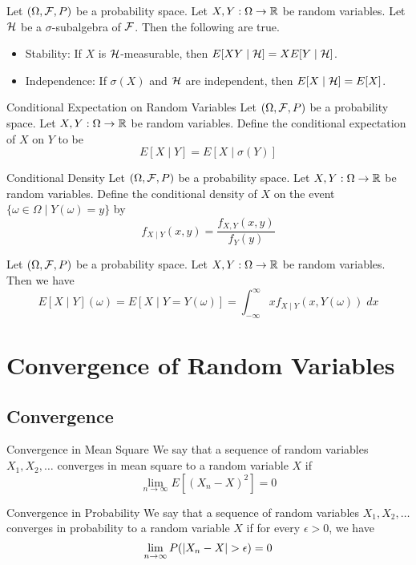 \documentclass[a4paper]{article}
\begin{document}
\begin{lmm}{}{} Let $(\Omega,\mathcal{F},P)$ be a probability space. Let $X,Y:\Omega\to\mathbb{R}$ be random variables. Let $\mathcal{H}$ be a $\sigma$-subalgebra of $\mathcal{F}$. Then the following are true. 
\begin{itemize}
\item Stability: If $X$ is $\mathcal{H}$-measurable, then $E[XY\;|\;\mathcal{H}]=XE[Y\;|\;\mathcal{H}]$. 
\item Independence: If $\sigma(X)$ and $\mathcal{H}$ are independent, then $E[X\;|\;\mathcal{H}]=E[X]$. 
\end{itemize}
\end{lmm}

\begin{defn}{Conditional Expectation on Random Variables}{} Let $(\Omega,\mathcal{F},P)$ be a probability space. Let $X,Y:\Omega\to\mathbb{R}$ be random variables. Define the conditional expectation of $X$ on $Y$ to be $$E[X\;|\;Y]=E[X\;|\;\sigma(Y)]$$
\end{defn}

\begin{defn}{Conditional Density}{} Let $(\Omega,\mathcal{F},P)$ be a probability space. Let $X,Y:\Omega\to\mathbb{R}$ be random variables. Define the conditional density of $X$ on the event $\{\omega\in\Omega\;|\;Y(\omega)=y\}$ by $$f_{X\;|\;Y}(x,y)=\frac{f_{X,Y}(x,y)}{f_Y(y)}$$
\end{defn}

\begin{lmm}{}{} Let $(\Omega,\mathcal{F},P)$ be a probability space. Let $X,Y:\Omega\to\mathbb{R}$ be random variables. Then we have $$E[X\;|\;Y](\omega)=E[X\;|\;Y=Y(\omega)]=\int_{-\infty}^\infty xf_{X\;|\;Y}(x,Y(\omega))\;dx$$
\end{lmm}

\pagebreak
\section{Convergence of Random Variables}
\subsection{Convergence}
\begin{defn}{Convergence in Mean Square}{} We say that a sequence of random variables $X_1,X_2,\dots$ converges in mean square to a random variable $X$ if $$\lim_{n\to\infty}E[(X_n-X)^2]=0$$
\end{defn}

\begin{defn}{Convergence in Probability}{} We say that a sequence of random variables $X_1,X_2,\dots$ converges in probability to a random variable $X$ if for every $\epsilon>0$, we have $$\lim_{n\to\infty}P(\abs{X_n-X}>\epsilon)=0$$
\end{defn}
\end{document}
